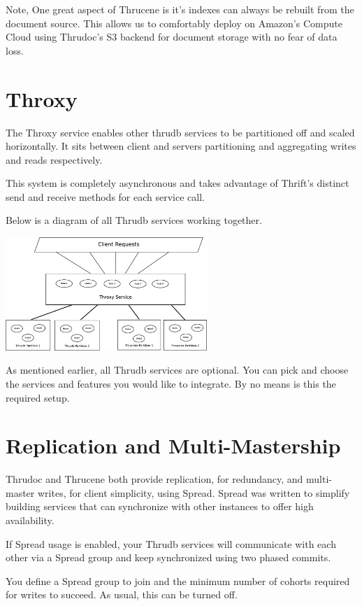 \documentclass[nocopyrightspace,blockstyle]{sigplanconf}
\begin{document}
Note, One great aspect of Thrucene is it's indexes can always be rebuilt from the document source.
This allows us to comfortably deploy on Amazon's Compute Cloud using Thrudoc's S3 backend for
document storage with no fear of data loss.

\section{Throxy}

The Throxy service enables other thrudb services to be partitioned off and scaled horizontally.
It sits between client and servers partitioning and aggregating writes and reads respectively.

This system is completely asynchronous and takes advantage of
Thrift's distinct send and receive methods for each service call.

Below is a diagram of all Thrudb services working together.

\includegraphics[width=3.00in]{Throxy.eps}

As mentioned earlier, all Thrudb services are optional. You can pick and choose the services and features you would like to integrate.
By no means is this the required setup.

\section{Replication and Multi-Mastership}

Thrudoc and Thrucene both provide replication, for redundancy, and multi-master writes, for client simplicity, using
Spread.  Spread was written to simplify building services that can synchronize with other instances to offer high availability.

If Spread usage is enabled, your Thrudb services will communicate with each other via a Spread group and keep synchronized using two phased commits.

You define a Spread group to join and the minimum number of cohorts required for writes to succeed.  As usual, this can be turned off.
\end{document}
